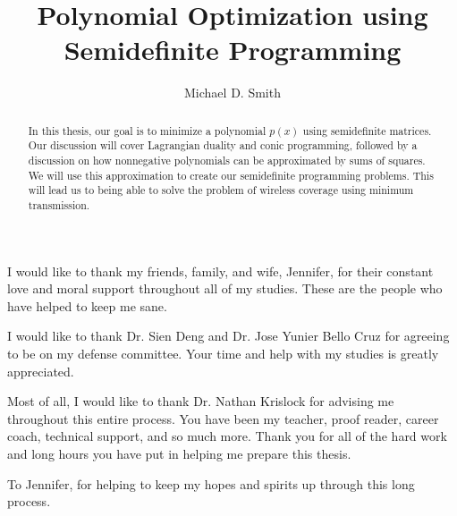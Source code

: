 \documentclass[12pt]{niuthesis}
\newcommand{\red}[1]{{\color{red} #1}}
\begin{document}
\title{Polynomial Optimization using Semidefinite Programming}

\author{Michael D. Smith}


\begin{abstract}
  In this thesis, our goal is to minimize a polynomial $p(x)$ using semidefinite matrices. Our discussion will cover Lagrangian duality and conic programming, followed by a discussion on how nonnegative polynomials can be approximated by sums of squares. We will use this approximation to create our semidefinite programming problems. This will lead us to being able to solve the problem of wireless coverage using minimum transmission.
\end{abstract}

\begin{acknowledgments}
  I would like to thank my friends, family, and wife, Jennifer, for their constant love and moral support throughout all of my studies. These are the people who have helped to keep me sane. 
  
  I would like to thank Dr. Sien Deng and Dr. Jose Yunier Bello Cruz for agreeing to be on my defense committee. Your time and help with my studies is greatly appreciated.
  
  Most of all, I would like to thank Dr. Nathan Krislock for advising me throughout this entire process. You have been my teacher, proof reader, career coach, technical support, and so much more. Thank you for all of the hard work and long hours you have put in helping me prepare this thesis. 
\end{acknowledgments}

\begin{dedication}
  To Jennifer, for helping to keep my hopes and spirits up through this long process.
\end{dedication}

\MakeThesisPrologue %






\appendix
\end{document}
